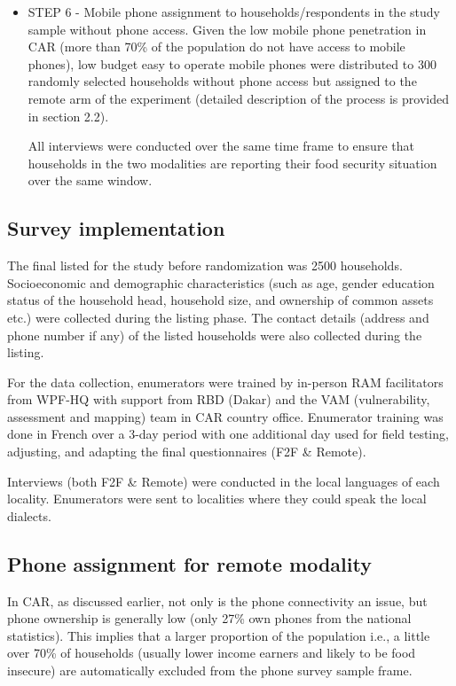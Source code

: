 \documentclass[11pt,harvard]{article}
\begin{document}
\begin{itemize}[label=--, left=1.5em]
	\item[6.] STEP 6 - Mobile phone assignment to households/respondents in the study sample without phone access. Given the low mobile phone penetration in CAR (more than 70\% of the population do not have access to mobile phones), low budget easy to operate mobile phones were distributed to 300 randomly selected households without phone access but assigned to the remote arm of the experiment (detailed description of the process is provided in section 2.2).
	
	All interviews were conducted over the same time frame to ensure that households in the two modalities are reporting their food security situation over the same window. 
	\end{itemize}

	
\subsection{Survey implementation}
		
The final listed for the study before randomization was 2500 households. Socioeconomic and demographic characteristics (such as age, gender education status of the household head, household size, and ownership of common assets etc.) were collected during the listing phase. The contact details (address and phone number if any) of the listed households were also collected during the listing. 

For the data collection, enumerators were trained by in-person RAM facilitators from WPF-HQ with support from RBD (Dakar) and the VAM (vulnerability, assessment and mapping) team in CAR country office. Enumerator training was done in French over a 3-day period with one additional day used for field testing, adjusting, and adapting the final questionnaires (F2F \& Remote). 
	
Interviews (both F2F \& Remote) were conducted in the local languages of each locality. Enumerators were sent to localities where they could speak the local dialects.
	
	
\subsection{Phone assignment for remote modality}
	
In CAR, as discussed earlier, not only is the phone connectivity an issue, but phone ownership is generally low (only 27\% own phones from the national statistics). This implies that a larger proportion of the population i.e., a little over 70\% of households (usually lower income earners and likely to be food insecure) are automatically excluded from the phone survey sample frame. 
	
\end{document}
